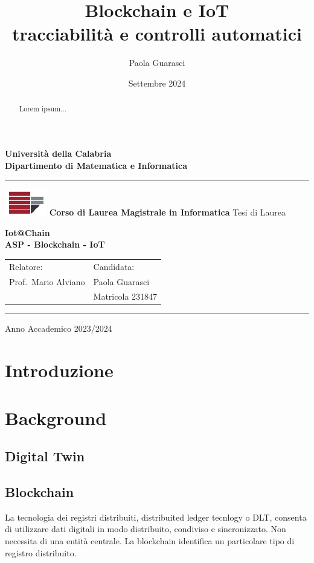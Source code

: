 \documentclass[a4paper,11pt]{article}
\title{Blockchain e IoT \\ tracciabilità e controlli automatici}
\author{Paola Guarasci}
\date{Settembre 2024}
\begin{document}
\begin{titlepage}
  \begin{center}
    \textbf{\LARGE Universit\`a della Calabria}\\
    \textbf{Dipartimento di Matematica e Informatica}\\
    \vskip 6pt
    \hrule
    \vskip 8pt
    \includegraphics{./img/logo_unical.png}
    \vskip 8pt
    \textbf{Corso di Laurea Magistrale in Informatica}
    \vskip 32pt
    Tesi di Laurea

    \vskip 70pt
      { \huge \bfseries Iot@Chain\\[0.4cm]ASP - Blockchain - IoT}\\[0.2cm]
    \vskip 150pt

    \begin{tabular}{p{8cm}p{8cm}}
      Relatore:           & Candidata:       \\
      Prof.~Mario Alviano & Paola Guarasci   \\
                          & Matricola 231847 \\
    \end{tabular}

    \vskip 76pt
    \hrule
    \vskip 5pt
    Anno Accademico 2023/2024
    \vfill
  \end{center}

\end{titlepage}
\clearpage
\tableofcontents
\clearpage
\begin{abstract}
  Lorem ipsum...
\end{abstract}
\section{Introduzione}
\section{Background}

\subsection{Digital Twin}

\subsection{Blockchain}
La tecnologia dei registri distribuiti, distribuited ledger tecnlogy o DLT, consenta di utilizzare dati digitali in modo distribuito, condiviso e sincronizzato. Non necessita di una entità centrale. La blockchain identifica un particolare tipo di registro distribuito.
\end{document}

